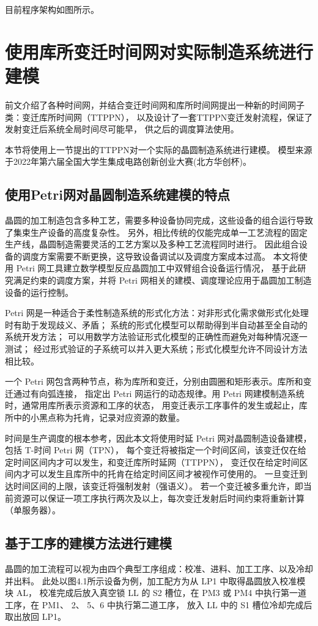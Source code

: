 目前程序架构如图所示。

\section{使用库所变迁时间网对实际制造系统进行建模}
前文介绍了各种时间网，并结合变迁时间网和库所时间网提出一种新的时间网子类：变迁库所时间网（TTPPN），
以及设计了一套TTPPN变迁发射流程，保证了发射变迁后系统全局时间尽可能早，
供之后的调度算法使用。

本节将使用上一节提出的TTPPN对一个实际的晶圆制造系统进行建模。
模型来源于2022年第六届全国大学生集成电路创新创业大赛(北方华创杯)。

\subsection{使用Petri网对晶圆制造系统建模的特点}
晶圆的加工制造包含多种工艺，需要多种设备协同完成，这些设备的组合运行导致了集束生产设备的高度复杂性。
另外，相比传统的仅能完成单一工艺流程的固定生产线，晶圆制造需要灵活的工艺方案以及多种工艺流程同时进行。
因此组合设备的调度方案需要不断更换，这导致设备调试以及调度方案成本过高。
本文将使用 Petri 网工具建立数学模型反应晶圆加工中双臂组合设备运行情况，
基于此研究满足约束的调度方案，并将 Petri 网相关的建模、调度理论应用于晶圆加工制造设备的运行控制。

Petri 网是一种适合于柔性制造系统的形式化方法：对非形式化需求做形式化处理时有助于发现歧义、矛盾；
系统的形式化模型可以帮助得到半自动甚至全自动的系统开发方法；
可以用数学方法验证形式化模型的正确性而避免对每种情况逐一测试；
经过形式验证的子系统可以并入更大系统；形式化模型允许不同设计方法相比较。

一个 Petri 网包含两种节点，称为库所和变迁，分别由圆圈和矩形表示。库所和变迁通过有向弧连接，
指定出 Petri 网运行的动态规律。用 Petri 网建模制造系统时，通常用库所表示资源和工序的状态，
用变迁表示工序事件的发生或起止，库所中的小黑点称为托肯，记录对应资源的数量。

时间是生产调度的根本参考，因此本文将使用时延 Petri 网对晶圆制造设备建模，包括 T-时间 Petri 网（TPN），
每个变迁将被指定一个时间区间，该变迁仅在给定时间区间内才可以发生，和变迁库所时延网（TTPPN），
变迁仅在给定时间区间内才可以发生且库所中的托肯在给定时间区间才被视作可使用的。
一旦变迁到达时间区间的上限，该变迁将强制发射（强语义）。
若一个变迁被多重允许，即当前资源可以保证一项工序执行两次及以上，每次变迁发射后时间约束将重新计算（单服务器）。

\subsection{基于工序的建模方法进行建模}
晶圆的加工流程可以视为由四个典型工序组成：校准、进料、加工工序、以及冷却并出料。
此处以图4.1所示设备为例，加工配方为从 LP1 中取得晶圆放入校准模块 AL，
校准完成后放入真空锁 LL 的 S2 槽位，在 PM3 或 PM4 中执行第一道工序，在 PM1、 2、 5、6 中执行第二道工序，
放入 LL 中的 S1 槽位冷却完成后取出放回 LP1。

